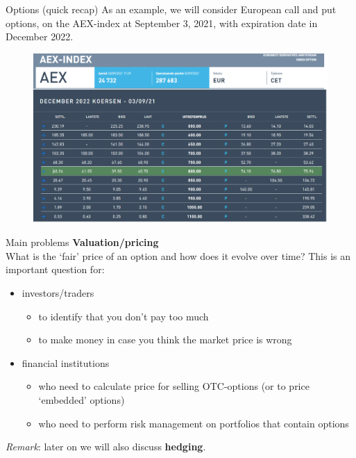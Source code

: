 \documentclass[pdf, handout]{beamer}
\begin{document}
\begin{frame}{Options (quick recap)}
As an example, we will consider European call and put options, on the AEX-index at September 3, 2021, with expiration date in December 2022.
\begin{figure}
\includegraphics[width=1\textwidth]{AEX-opties}
\end{figure}
\end{frame}

\begin{frame}{Main problems}
\textbf{Valuation/pricing} \\
What is the `fair' price of an option and how does it evolve over time? This is an important question for:
\begin{itemize}
\item investors/traders
\begin{itemize}
\item to identify that you don't pay too much
\item to make money in case you think the market price is wrong
\end{itemize}
\item financial institutions
\begin{itemize}
\item who need to calculate price for selling
OTC-options (or to price `embedded' options)
\item who need to perform risk management on
portfolios that contain options 
\end{itemize}
\end{itemize}
\vspace{.5cm}
\emph{Remark}: later on we will also discuss \textbf{hedging}.
\end{frame}
\end{document}
